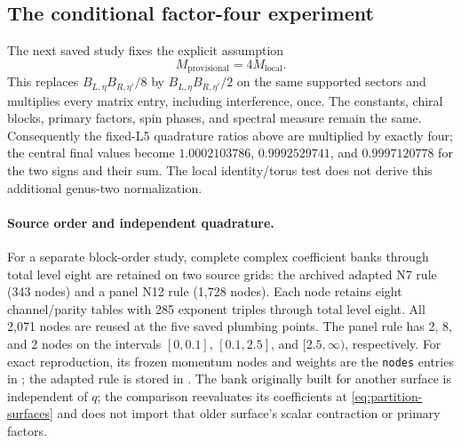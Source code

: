 \subsection{The conditional factor-four experiment}

The next saved study fixes the explicit assumption
\begin{equation}
 M_{\mathrm{provisional}}=4M_{\mathrm{local}}.
 \label{eq:partition-factor-four}
\end{equation}
This replaces $B_{L,\eta}B_{R,\eta'}/8$ by
$B_{L,\eta}B_{R,\eta'}/2$ on the same supported sectors and
multiplies every matrix entry, including interference, once.
The constants, chiral blocks, primary factors, spin phases,
and spectral measure remain the same. Consequently the
fixed-L5 quadrature ratios above are multiplied by exactly
four; the central final values become
$1.0002103786$, $0.9992529741$, and $0.9997120778$ for the
two signs and their sum. The local identity/torus test does
not derive this additional genus-two normalization.

\paragraph{Source order and independent quadrature.}
For a separate block-order study, complete complex coefficient
banks through total level eight are retained on two source
grids: the archived adapted N7 rule (343 nodes) and a panel
N12 rule (1,728 nodes). Each node retains eight channel/parity
tables with 285 exponent triples through total level eight.
All 2,071 nodes are reused at the five saved plumbing points.
The panel rule has 2, 8, and 2 nodes on the intervals
$[0,0.1]$, $[0.1,2.5]$, and $[2.5,\infty)$, respectively.
For exact reproduction, its frozen momentum nodes and weights
are the \texttt{nodes} entries in
;
the adapted rule is stored in
.
The bank originally built for another surface is independent
of $q$; the comparison reevaluates its coefficients at
\eqref{eq:partition-surfaces} and does not import that older
surface's scalar contraction or primary factors.

